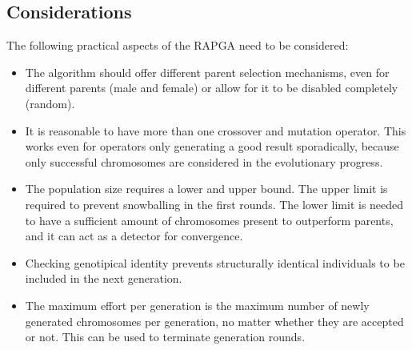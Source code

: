 \documentclass[../main.tex]{subfiles}
\begin{document}
\subsection{Considerations}

The following practical aspects of the RAPGA need to be considered:

\begin{itemize}
    \item The algorithm should offer different parent selection mechanisms, even for different parents (male and female) or allow for it to be disabled completely (random).
    \item It is reasonable to have more than one crossover and mutation operator. This works even for operators only generating a good result sporadically, because only successful chromosomes are considered in the evolutionary progress.
    \item The population size requires a lower and upper bound. The upper limit is required to prevent snowballing in the first rounds. The lower limit is needed to have a sufficient amount of chromosomes present to outperform parents, and it can act as a detector for convergence.
    \item Checking genotipical identity prevents structurally identical individuals to be included in the next generation.
    \item The maximum effort per generation is the maximum number of newly generated chromosomes per generation, no matter whether they are accepted or not. This can be used to terminate generation rounds.
\end{itemize}
\end{document}
